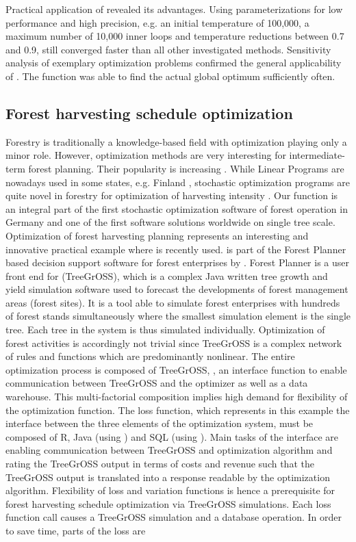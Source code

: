 Practical application of  revealed its advantages. Using parameterizations for low performance and high precision, e.g. an initial temperature of 100,000, a maximum number of 10,000 inner loops and temperature reductions between 0.7 and 0.9, still converged faster than all other investigated methods. Sensitivity analysis of exemplary optimization problems confirmed the general applicability of . The function was able to find the actual global optimum sufficiently often.

\subsection{Forest harvesting schedule optimization}
Forestry is traditionally a knowledge-based field with optimization playing only a minor role. However, optimization methods are very interesting for intermediate-term forest planning. Their popularity is increasing \citet{mohring_2010}. While Linear Programs are nowadays used in some states, e.g. Finland \citep{redsven_2012}, stochastic optimization programs are quite novel in forestry for optimization of harvesting intensity \citep{kangas_2015}. Our function is an integral part of the first stochastic optimization software of forest operation in Germany and one of the first software solutions worldwide on single tree scale. Optimization of forest harvesting planning represents an interesting and innovative practical example where  is recently used.  is part of the Forest Planner based decision support software for forest enterprises by \citet{hansen_2014}. Forest Planner is a user front end for  (TreeGrOSS), which is a complex Java written tree growth and yield simulation software used to forecast the developments of forest management areas (forest sites). It is a tool able to simulate forest enterprises with hundreds of forest stands simultaneously where the smallest simulation element is the single tree. Each tree in the system is thus simulated individually. Optimization of forest activities is accordingly not trivial since TreeGrOSS is a complex network of rules and functions which are predominantly nonlinear. The entire optimization process is composed of TreeGrOSS, , an interface function to enable communication between TreeGrOSS and the optimizer as well as a data warehouse. This multi-factorial composition implies high demand for flexibility of the optimization function. The loss function, which represents in this example the interface between the three elements of the optimization system, must be composed of R, Java (using ) and SQL (using ). Main tasks of the interface are enabling communication between TreeGrOSS and optimization algorithm and rating the TreeGrOSS output in terms of costs and revenue such that the TreeGrOSS output is translated into a response readable by the optimization algorithm. Flexibility of loss and variation functions is hence a prerequisite for forest harvesting schedule optimization via TreeGrOSS simulations. Each loss function call causes a TreeGrOSS simulation and a database operation. In order to save time, parts of the loss are 